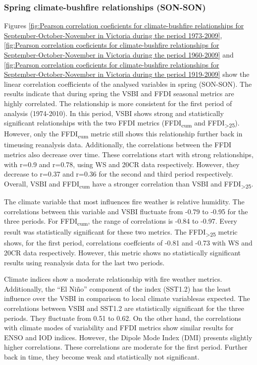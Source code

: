 \subsubsection{Spring climate-bushfire relationships (SON-SON)}

Figures \ref{fig:Pearson correlation coeficients for climate-bushfire relationships for September-October-November in Victoria during the period 1973-2009},
\ref{fig:Pearson correlation coeficients for climate-bushfire relationships for September-October-November in Victoria during the period 1960-2009}
and \ref{fig:Pearson correlation coeficients for climate-bushfire relationships for September-October-November in Victoria during the period 1919-2009}
show the linear correlation coefficients of the analysed variables
in spring (SON-SON). The results indicate that during spring the VSBI
and FFDI seasonal metrics are highly correlated. The relationship
is more consistent for the first period of analysis (1974-2010). In
this period, VSBI shows strong and statistically significant relationships
with the two FFDI metrics (FFDI\textsubscript{cum} and FFDI\textsubscript{>25}).
However, only the FFDI\textsubscript{cum} metric still shows this
relationship further back in time\textemdash using reanalysis data\textemdash .
Additionally, the correlations between the FFDI metrics also decrease
over time. These correlations start with strong relationships, with
r=0.9 and r=0.78, using WS and 20CR data respectively. However, they
decrease to r=0.37 and r=0.36 for the second and third period respectively.
Overall, VSBI and FFDI\textsubscript{cum} have a stronger correlation
than VSBI and FFDI\textsubscript{>25}. 

The climate variable that most influences fire weather is relative
humidity. The correlations between this variable and VSBI fluctuate
from -0.79 to -0.95 for the three periods. For FFDI\textsubscript{cum},
the range of correlations is -0.84 to -0.97. Every result was statistically
significant for these two metrics. The FFDI\textsubscript{>25} metric
shows, for the first period, correlations coeffcients of -0.81 and
-0.73 with WS and 20CR data respectively. However, this metric shows
no statistically significant results using reanalysis data for the
last two periods. 

Climate indices show a moderate relationship with fire weather metrics.
Additionally, the \textquotedblleft El Ni\~no\textquotedblright{} component
of the index (SST1.2) has the least influence over the VSBI in comparison
to local climate variables\textemdash as expected\textemdash . The
correlations between VSBI and SST1.2 are statistically significant
for the three periods. They fluctuate from 0.51 to 0.62. On the other
hand, the correlations with climate modes of variability and FFDI
metrics show similar results for ENSO and IOD indices. However, the
Dipole Mode Index (DMI) presents slightly higher correlations. These
correlations are moderate for the first period. Further back in time,
they become weak and statistically not significant. 

